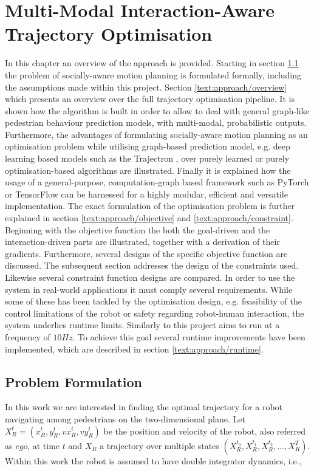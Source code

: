 \chapter{Multi-Modal Interaction-Aware Trajectory Optimisation}
\label{text:approach}
In this chapter an overview of the approach is provided. Starting in section \ref{text:approach/formulation} the problem of socially-aware motion planning is formulated formally, including the assumptions made within this project. 
\newline
Section \ref{text:approach/overview} which presents an overview over the full trajectory optimisation pipeline. It is shown how the algorithm is built in order to allow to deal with general graph-like pedestrian behaviour prediction models, with multi-modal, probabilistic outputs. Furthermore, the advantages of formulating socially-aware motion planning as an optimisation problem while utilising graph-based prediction model, e.g. deep learning based models such as the Trajectron \cite{Ivanovic18}, over purely learned \cite{Chen2017} or purely optimisation-based \cite{Berg2011} algorithms are illustrated. Finally it is explained how the usage of a general-purpose, computation-graph based framework such as PyTorch \cite{pytorch} or TensorFlow \cite{tensorflow} can be harnessed for a highly modular, efficient and versatile implementation.
\newline
The exact formulation of the optimisation problem is further explained in section \ref{text:approach/objective} and \ref{text:approach/constraint}. Beginning with the objective function the both the goal-driven and the interaction-driven parts are illustrated, together with a derivation of their gradients. Furthermore, several designs of the specific objective function are discussed. The subsequent section addresses the design of the constraints used. Likewise several constraint function designs are compared. 
\newline
In order to use the system in real-world applications it must comply several requirements. While some of these has been tackled by the optimisation design, e.g. feasibility of the control limitations of the robot or safety regarding robot-human interaction, the system underlies runtime limits. Similarly to \cite{Chen2017} this project aims to run at a frequency of $10 Hz$. To achieve this goal several runtime improvements have been implemented, which are described in section \ref{text:approach/runtime}.


\section{Problem Formulation}
\label{text:approach/formulation}
In this work we are interested in finding the optimal trajectory for a robot navigating among pedestrians on the two-dimensional plane. Let $X_R^t = (x_R^t, y_R^t, vx_R^t, vy_R^t)$ be the position and velocity of the robot, also referred as $ego$, at time $t$ and $X_R$ a trajectory over multiple states $(X_R^{t_0}, X_R^{t_1}, X_R^{t_2}, \hdots, X_R^{T})$. Within this work the robot is assumed to have double integrator dynamics, i.e., 

